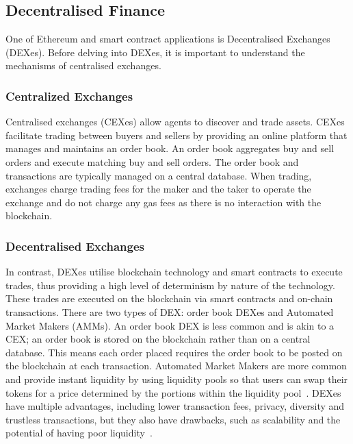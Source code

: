 \subsection{Decentralised Finance}
One of Ethereum and smart contract applications is Decentralised Exchanges (DEXes). Before delving into DEXes, it is important to understand the mechanisms of centralised exchanges.

\subsubsection{Centralized Exchanges}
Centralised exchanges (CEXes) allow agents to discover and trade assets. CEXes facilitate trading between buyers and sellers by providing an online platform that manages and maintains an order book. An order book aggregates buy and sell orders and execute matching buy and sell orders. The order book and transactions are typically managed on a central database. When trading, exchanges charge trading fees for the maker and the taker to operate the exchange and do not charge any gas fees as there is no interaction with the blockchain. 

\subsubsection{Decentralised Exchanges}
In contrast, DEXes utilise blockchain technology and smart contracts to execute trades, thus providing a high level of determinism by nature of the technology. These trades are executed on the blockchain via smart contracts and on-chain transactions. There are two types of DEX: order book DEXes and Automated Market Makers (AMMs). An order book DEX is less common and is akin to a CEX; an order book is stored on the blockchain rather than on a central database. This means each order placed requires the order book to be posted on the blockchain at each transaction. Automated Market Makers are more common and provide instant liquidity by using liquidity pools so that users can swap their tokens for a price determined by the portions within the liquidity pool~\cite{DEXes}. DEXes have multiple advantages, including lower transaction fees, privacy, diversity and trustless transactions, but they also have drawbacks, such as scalability and the potential of having poor liquidity~\cite{DEXvsCEX}.

